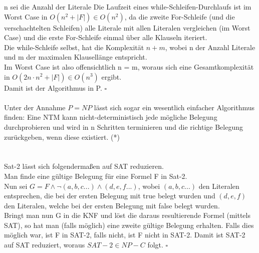 \documentclass[fleqn]{article}
\begin{document}
n sei die Anzahl der Literale
Die Laufzeit eines while-Schleifen-Durchlaufs ist im Worst Case in $O(n^2 + |F|) \in O(n^2)$, da die zweite For-Schleife (und die verschachtelten Schleifen) alle Literale mit allen Literalen vergleichen (im Worst Case) und die erste For-Schleife einmal über alle Klauseln iteriert.\\
Die while-Schleife selbst, hat die Komplexität $n + m$, wobei n der Anzahl Literale und m der maximalen Klausellänge entspricht.\\
Im Worst Case ist also offensichtlich n = m, woraus sich eine Gesamtkomplexität in $O(2n \cdot n^2 + |F|) \in O(n^3)$ ergibt.\\
Damit ist der Algorithmus in P. $\square$\\
\\
Unter der Annahme $P = NP$ lässt sich sogar ein wesentlich einfacher Algorithmus finden: Eine NTM kann nicht-deterministisch jede mögliche Belegung durchprobieren und wird in n Schritten terminieren und die richtige Belegung zurückgeben, wenn diese existiert. (*)

\section{}%
\subsection{}%
Sat-2 lässt sich folgendermaßen auf SAT reduzieren.\\
Man finde eine gültige Belegung für eine Formel F in Sat-2.\\
Nun sei $G = F \wedge \neg(a, b, c ...) \wedge (d, e, f ...)$, wobei $(a, b, c ...) $ den Literalen entsprechen, die bei der ersten Belegung mit true belegt wurden und $(d,e, f)$ den Literalen, welche bei der ersten Belegung mit false belegt wurden.\\
Bringt man nun G in die KNF und löst die daraus resultierende Formel (mittels SAT), so hat man (falls möglich) eine zweite gültige Belegung erhalten. Falls dies möglich war, ist F in SAT-2, falls nicht, ist F nicht in SAT-2. Damit ist SAT-2 auf SAT reduziert, woraus $SAT-2 \in NP-C$ folgt. $\square$
\end{document}
